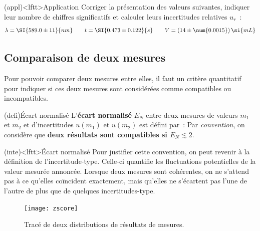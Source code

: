 \documentclass[../../main/main.tex]{subfiles}
\begin{document}
\begin{tcb*}(appl)<lftt>{Application}
	Corriger la présentation des valeurs suivantes, indiquer leur nombre de
	chiffres significatifs et calculer leurs incertitudes relatives $u_r$~:
	\[
		\lambda = \SI{589.0\pm11}{nm}
		\qquad
		t = \SI{0.473 \pm 0.122}{s}
		\qquad
		V = (14 \pm \num{0.0015})\,\si{mL}
	\]
	\tcblower
\end{tcb*}

\subsection{Comparaison de deux mesures}
Pour pouvoir comparer deux mesures entre elles, il faut un critère quantitatif
pour indiquer si ces deux mesures sont considérées comme compatibles ou
incompatibles.
\begin{tcb*}(defi){Écart normalisé}
	L'\textbf{écart normalisé} $E_N$ entre deux mesures de valeurs $m_1$ et $m_2$ et d'incertitudes
	$u(m_1)$ et $u(m_2)$ est défini par~:
	\psw{%
		\[
			\boxed{E_N = \frac{\abs{m_1-m_2}}{\sqrt{u(m_1)^{2} + u(m_2)^{2}}}}
		\]
	}%
	Par \textit{convention}, on considère que \textbf{deux résultats sont
		compatibles si $E_N \lesssim 2$}.
\end{tcb*}


\begin{tcb}(inte)<lftt>{Écart normalisé}
	Pour justifier cette convention, on peut revenir à la définition de
	l'incertitude-type. Celle-ci quantifie les fluctuations potentielles de la
	valeur mesurée annoncée. Lorsque deux mesures sont cohérentes, on ne s'attend
	pas à ce qu'elles coïncident exactement, mais qu'elles ne s'écartent pas l'une
	de l'autre de plus que de quelques incertitudes-type.
\end{tcb}

\begin{figure}[htbp]
	\centering
	\texttt{[image: zscore]}
	\caption{Tracé de deux distributions de résultats de mesures.}
	\label{fig:zscore}
\end{figure}
\end{document}
